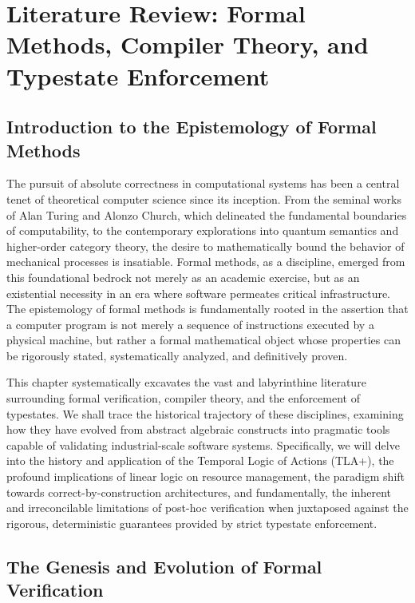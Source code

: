 \chapter{Literature Review: Formal Methods, Compiler Theory, and Typestate Enforcement}
\label{ch:lit_review_formal}

\section{Introduction to the Epistemology of Formal Methods}

The pursuit of absolute correctness in computational systems has been a central tenet of theoretical computer science since its inception. From the seminal works of Alan Turing and Alonzo Church, which delineated the fundamental boundaries of computability, to the contemporary explorations into quantum semantics and higher-order category theory, the desire to mathematically bound the behavior of mechanical processes is insatiable. Formal methods, as a discipline, emerged from this foundational bedrock not merely as an academic exercise, but as an existential necessity in an era where software permeates critical infrastructure. The epistemology of formal methods is fundamentally rooted in the assertion that a computer program is not merely a sequence of instructions executed by a physical machine, but rather a formal mathematical object whose properties can be rigorously stated, systematically analyzed, and definitively proven.

This chapter systematically excavates the vast and labyrinthine literature surrounding formal verification, compiler theory, and the enforcement of typestates. We shall trace the historical trajectory of these disciplines, examining how they have evolved from abstract algebraic constructs into pragmatic tools capable of validating industrial-scale software systems. Specifically, we will delve into the history and application of the Temporal Logic of Actions (TLA+), the profound implications of linear logic on resource management, the paradigm shift towards correct-by-construction architectures, and fundamentally, the inherent and irreconcilable limitations of post-hoc verification when juxtaposed against the rigorous, deterministic guarantees provided by strict typestate enforcement.

\section{The Genesis and Evolution of Formal Verification}

